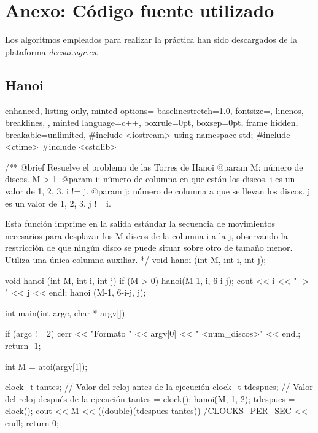 \documentclass[12pt,spanish]{article}
\begin{document}
\section{Anexo: Código fuente utilizado}

Los algoritmos empleados para realizar la práctica han sido descargados de la plataforma \textit{decsai.ugr.es}.
\subsection{Hanoi}
\begin{multicols}{2}
\begin{tcblisting}{
  enhanced,
  listing only,
  minted options={
    baselinestretch=1.0,
    fontsize=\footnotesize,
    linenos,
    breaklines,
  },
  minted language=c++,
  boxrule=0pt,
  boxsep=0pt,
  frame hidden,
  breakable=unlimited,
}  
#include <iostream>
using namespace std;
#include <ctime>
#include <cstdlib>

/**
   @brief Resuelve el problema de las Torres de Hanoi
   @param M: número de discos. M > 1.
   @param i: número de columna en que están los discos.
             i es un valor de {1, 2, 3}. i != j.
   @param j: número de columna a que se llevan los discos.
             j es un valor de {1, 2, 3}. j != i.

   Esta función imprime en la salida estándar la secuencia de 
   movimientos necesarios para desplazar los M discos de la
   columna i a la j, observando la restricción de que ningún
   disco se puede situar sobre otro de tamaño menor. Utiliza
   una única columna auxiliar.
*/
void hanoi (int M, int i, int j);

void hanoi (int M, int i, int j)
{
  if (M > 0)
    {
      hanoi(M-1, i, 6-i-j);
      cout << i << " -> " << j << endl;
      hanoi (M-1, 6-i-j, j);
  }
}

int main(int argc, char * argv[])
{
  
    if (argc != 2)
    {
      cerr << "Formato " << argv[0] << " <num_discos>" << endl;
      return -1;
    }

  int M = atoi(argv[1]);

  clock_t tantes;    // Valor del reloj antes de la ejecución
  clock_t tdespues;  // Valor del reloj después de la ejecución
  tantes = clock();
  hanoi(M, 1, 2);
  tdespues = clock();
  cout << M << 
  ((double)(tdespues-tantes))
  /CLOCKS_PER_SEC << endl; 
  return 0;
}
\end{tcblisting}
\end{multicols}
\newpage
\end{document}
